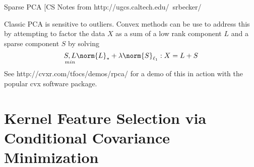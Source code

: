 Sparse PCA
[CS Notes from http://ugcs.caltech.edu/~srbecker/

Classic PCA is sensitive to outliers.  Convex methods can be use to address this by attempting to factor the data $X$ as a sum of a low rank component $L$ and a sparse component $S$ by solving
\begin{equation*}
\underset{min}{S,L} \norm{L}_* + \lambda \norm{S}_{\ell_1}  : X=L+S
\end{equation*}
See http://cvxr.com/tfocs/demos/rpca/ for a demo of this in action with the popular cvx software package.

\section*{Kernel Feature Selection via Conditional Covariance Minimization}




